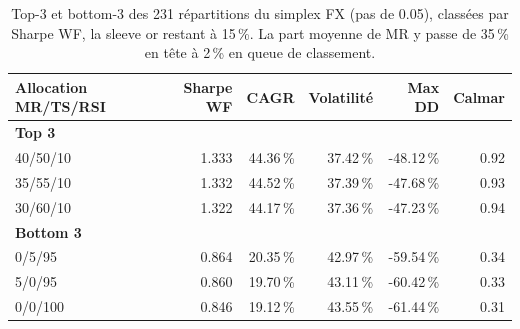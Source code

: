 \begin{table}[H]
\centering
\caption{Top-3 et bottom-3 des 231 répartitions du simplex FX (pas de 0.05), classées par Sharpe WF, la sleeve or restant à 15\,\%. La part moyenne de MR y passe de 35\,\% en tête à 2\,\% en queue de classement.}
\label{tbl:weight_sensitivity_extremes}
\begin{tabular}{lrrrrr}
\toprule
Allocation MR/TS/RSI & Sharpe WF & CAGR & Volatilité & Max DD & Calmar \\
\midrule
\multicolumn{6}{l}{\textbf{Top 3}} \\
40/50/10 & 1.333 & 44.36\,\% & 37.42\,\% & -48.12\,\% & 0.92 \\
35/55/10 & 1.332 & 44.52\,\% & 37.39\,\% & -47.68\,\% & 0.93 \\
30/60/10 & 1.322 & 44.17\,\% & 37.36\,\% & -47.23\,\% & 0.94 \\
\midrule
\multicolumn{6}{l}{\textbf{Bottom 3}} \\
0/5/95 & 0.864 & 20.35\,\% & 42.97\,\% & -59.54\,\% & 0.34 \\
5/0/95 & 0.860 & 19.70\,\% & 43.11\,\% & -60.42\,\% & 0.33 \\
0/0/100 & 0.846 & 19.12\,\% & 43.55\,\% & -61.44\,\% & 0.31 \\
\bottomrule
\end{tabular}
\end{table}
